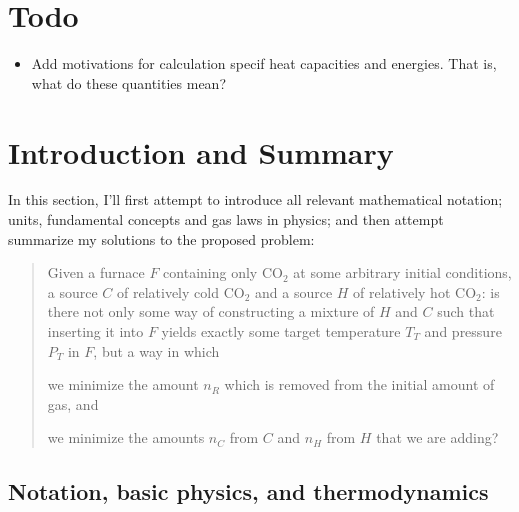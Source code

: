 \documentclass{article}
\newcommand{\CDiox}{\mathrm{CO}_2}
\begin{document}
\tableofcontents

\section*{Todo}
\begin{itemize}
    \item Add motivations for calculation specif heat capacities and energies.
        That is, what do these quantities mean?
\end{itemize}

\section{Introduction and Summary}
In this section, I'll first attempt to introduce all relevant mathematical notation;
units, fundamental concepts and gas laws in physics;
and then attempt summarize my solutions to the proposed problem:
\begin{quote}
    \begin{itshape}
        Given a furnace $F$ containing only $\CDiox$ at some arbitrary initial conditions, a source
        $C$ of relatively cold $\CDiox$ and a source $H$ of relatively hot $\CDiox$: is there not
        only some way of constructing a mixture of $H$ and $C$ such that inserting it into $F$
        yields exactly some target temperature $T_T$ and pressure $P_T$ in $F$, but a way in which
        \begin{enumerate*}[label=(\alph*)]
            \item we minimize the amount $n_R$ which is removed from the initial amount of gas, and
            \item we minimize the amounts $n_C$ from $C$ and $n_H$ from $H$ that we are adding?
        \end{enumerate*}
    \end{itshape}
\end{quote}

\subsection{Notation, basic physics, and thermodynamics}
\end{document}
